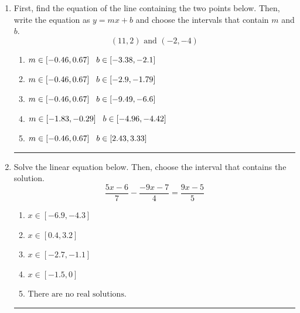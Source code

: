 \documentclass[14pt]{extbook}
\newcommand{\litem}[1]{\item#1\hspace*{-1cm}\rule{\textwidth}{0.4pt}}
\begin{document}
\begin{enumerate}
{\begin{enumerate}[label=\Alph*.]
\end{enumerate} }
\litem{
First, find the equation of the line containing the two points below. Then, write the equation as $ y=mx+b $ and choose the intervals that contain $m$ and $b$.\[ (11, 2) \text{ and } (-2, -4) \]\begin{enumerate}[label=\Alph*.]
\item \( m \in [-0.46, 0.67] \hspace*{3mm} b \in [-3.38, -2.1] \)
\item \( m \in [-0.46, 0.67] \hspace*{3mm} b \in [-2.9, -1.79] \)
\item \( m \in [-0.46, 0.67] \hspace*{3mm} b \in [-9.49, -6.6] \)
\item \( m \in [-1.83, -0.29] \hspace*{3mm} b \in [-4.96, -4.42] \)
\item \( m \in [-0.46, 0.67] \hspace*{3mm} b \in [2.43, 3.33] \)

\end{enumerate} }
\litem{
Solve the linear equation below. Then, choose the interval that contains the solution.\[ \frac{5x -6}{7} - \frac{-9x -7}{4} = \frac{9x -5}{5} \]\begin{enumerate}[label=\Alph*.]
\item \( x \in [-6.9, -4.3] \)
\item \( x \in [0.4, 3.2] \)
\item \( x \in [-2.7, -1.1] \)
\item \( x \in [-1.5, 0] \)
\item \( \text{There are no real solutions.} \)


\end{enumerate}}
\end{enumerate}
\end{document}
